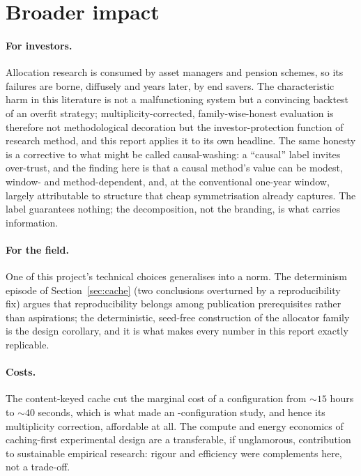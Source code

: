 \section{Broader impact}
\label{sec:impact}

\paragraph{For investors.} Allocation research is consumed by asset
managers
and pension schemes, so its failures are borne, diffusely and years
later, by end savers. The characteristic harm in this literature is not a
malfunctioning system but a convincing backtest of an overfit strategy;
multiplicity-corrected, family-wise-honest evaluation is therefore not
methodological decoration but the investor-protection function of research
method, and this report applies it to its own headline. The same honesty is
a corrective to what might be called causal-washing: a ``causal''
label invites over-trust, and the finding here is that a causal method's
value can be modest, window- and method-dependent, and, at the
conventional one-year window, largely attributable to structure that
cheap symmetrisation already captures. The label guarantees nothing; the
decomposition, not the branding, is what carries information.

\paragraph{For the field.} One of this project's technical choices
generalises into a norm. The determinism episode of Section~\ref{sec:cache}
(two conclusions
overturned by a reproducibility fix) argues that reproducibility
belongs among publication prerequisites rather than aspirations; the
deterministic, seed-free construction of the allocator family is the
design corollary, and it is what makes every number in this report
exactly replicable.

\paragraph{Costs.} The content-keyed cache cut the marginal cost of a
configuration from ${\sim}15$ hours to ${\sim}40$ seconds, which is what
made an \rsNtrials-configuration study, and hence its multiplicity
correction, affordable at all. The compute and energy economics of
caching-first experimental design are a transferable, if unglamorous,
contribution to sustainable empirical research: rigour and efficiency were
complements here, not a trade-off.

